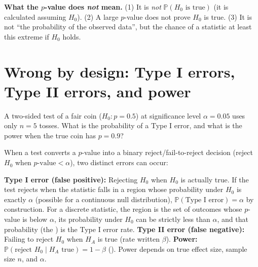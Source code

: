 \documentclass[10pt]{scrartcl}
\begin{document}
\medskip\noindent\textbf{What the $p$-value does \emph{not} mean.} (1) It is \emph{not} $\mathbb P(H_0\text{ is true})$ (it is calculated assuming $H_0$). (2) A large $p$-value does not prove $H_0$ is true. (3) It is not ``the probability of the observed data'', but the chance of a statistic at least this extreme if $H_0$ holds.

\section{Wrong by design: Type I errors, Type II errors, and power}

\begin{qbox}
  A two-sided test of a fair coin ($H_0\colon p = 0.5$) at significance level $\alpha = 0.05$ uses only $n = 5$ tosses. What is the probability of a Type I error, and what is the power when the true coin has $p = 0.9$?
\end{qbox}

When a test converts a $p$-value into a binary reject/fail-to-reject decision (reject $H_0$ when $p\text{-value} < \alpha$), two distinct errors can occur:
\begin{itemize}
  \ii \textbf{Type I error (false positive):} Rejecting $H_0$ when $H_0$ is actually true. If the test rejects when the statistic falls in a region whose probability under $H_0$ is exactly $\alpha$ (possible for a continuous null distribution), $\mathbb P(\text{Type I error}) = \alpha$ by construction. For a discrete statistic, the region is the set of outcomes whose $p$-value is below $\alpha$, its probability under $H_0$ can be strictly less than $\alpha$, and that probability (the ) is the Type I error rate.
  \ii \textbf{Type II error (false negative):} Failing to reject $H_0$ when $H_A$ is true (rate written $\beta$).
  \ii \textbf{Power:} $\mathbb P(\text{reject }H_0 \mid H_A\text{ true}) = 1 - \beta$ (). Power depends on true effect size, sample size $n$, and $\alpha$.
\end{itemize}
\end{document}
